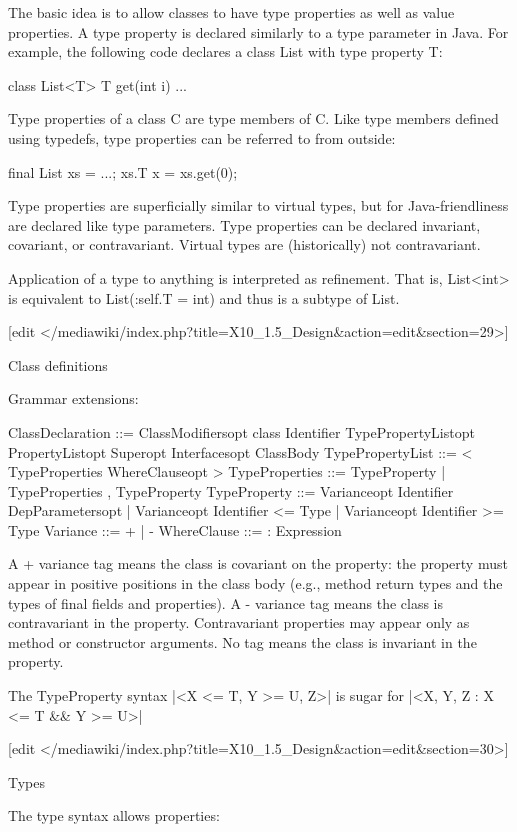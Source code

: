 
The basic idea is to allow classes to have type properties as well as
value properties. A type property is declared similarly to a type
parameter in Java. For example, the following code declares a class List
with type property T:

class List<T> { T get(int i) { ... } }

Type properties of a class C are type members of C. Like type members
defined using typedefs, type properties can be referred to from outside:

final List xs = ...;
xs.T x = xs.get(0);

Type properties are superficially similar to virtual types, but for
Java-friendliness are declared like type parameters. Type properties can
be declared invariant, covariant, or contravariant. Virtual types are
(historically) not contravariant.

Application of a type to anything is interpreted as refinement. That is,
List<int> is equivalent to List(:self.T = int) and thus is a subtype of
List.

[edit </mediawiki/index.php?title=X10_1.5_Design&action=edit&section=29>]


    Class definitions

Grammar extensions:

ClassDeclaration ::=
  ClassModifiersopt class Identifier
    TypePropertyListopt PropertyListopt
    Superopt Interfacesopt ClassBody
TypePropertyList ::= < TypeProperties WhereClauseopt >
TypeProperties ::= TypeProperty
                 | TypeProperties , TypeProperty
TypeProperty ::= Varianceopt Identifier DepParametersopt
               | Varianceopt Identifier <= Type
               | Varianceopt Identifier >= Type
Variance ::= + | -
WhereClause ::= : Expression

A + variance tag means the class is covariant on the property: the
property must appear in positive positions in the class body (e.g.,
method return types and the types of final fields and properties). A -
variance tag means the class is contravariant in the property.
Contravariant properties may appear only as method or constructor
arguments. No tag means the class is invariant in the property.

The TypeProperty syntax |<X <= T, Y >= U, Z>| is sugar for |<X, Y, Z : X
<= T && Y >= U>|

[edit </mediawiki/index.php?title=X10_1.5_Design&action=edit&section=30>]


    Types

The type syntax allows properties:

